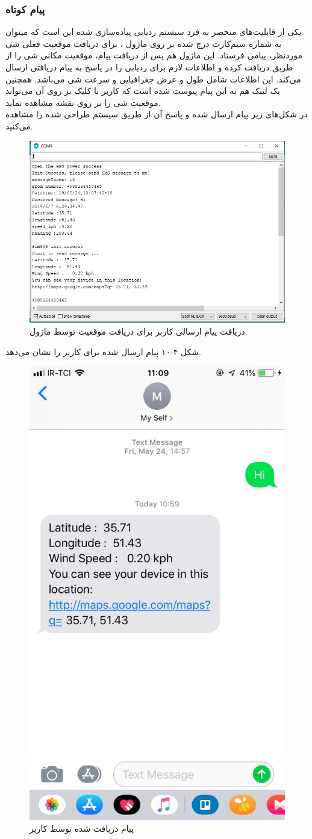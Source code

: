  \subsubsection{پیام کوتاه}
 یکی از قابلیت‌های منحصر به فرد سیستم ردیابی پیاده‌سازی شده این است که میتوان به شماره سیم‌کارت درج شده بر روی ماژول ، برای دریافت موقعیت فعلی شی موردنظر، پیامی فرستاد. این ماژول هم پس از دریافت پیام، موقعیت مکانی شی را از طریق  دریافت کرده و اطلاعات لازم برای ردیابی را در پاسخ به پیام دریافتی ارسال می‌کند. این اطلاعات شامل طول و عرض جغرافیایی و سرعت شی می‌باشد. همچنین یک لینک هم به این پیام پیوست شده است که کاربر با کلیک بر روی آن می‌تواند موقعیت شی را بر روی نقشه مشاهده نماید.\\
در شکل‌های زیر پیام ارسال شده و پاسخ آن از طریق سیستم طراحی شده را مشاهده می‌کنید.\\
 \begin{figure}[!h]
	\centerline{\includegraphics[width=.9\textwidth]{msg}}
	\caption{دریافت پیام ارسالی کاربر برای دریافت موقعیت توسط ماژول }
\end{figure}
\newpage
شکل ۴-۱۰ پیام ارسال شده برای کاربر را نشان می‌دهد.
 \begin{figure}[!h]
 	\centerline{\includegraphics[width=.3\textwidth]{sms}}
 	\caption{پیام دریافت شده توسط کاربر}
 \end{figure}
